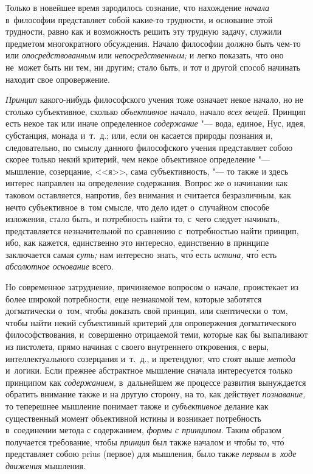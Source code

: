 Только в новейшее время зародилось сознание, что нахождение {\em начала}
в~философии представляет собой какие-то трудности, и основание этой трудности,
равно как и возможность решить эту трудную задачу, служили предметом
многократного обсуждения. Начало философии должно быть чем-то или {\em
опосредствованным} или {\em непосредственным;} и легко показать, что оно
не~может быть ни тем, ни другим; стало быть, и тот и другой способ начинать
находит свое опровержение.

{\em Принцип} какого-нибудь философского учения тоже означает некое начало, но
не столько субъективное, сколько {\em объективное} начало, начало
{\em всех вещей}. Принцип есть некое так или иначе определенное
{\em содержание} "--- вода, единое, Нус, идея, субстанция,
монада и~т.~д.; или, если он касается природы познания и, следовательно, по
смыслу данного философского учения представляет собою скорее только некий
критерий, чем некое объективное определение "--- мышление, созерцание, <<я>>,
сама субъективность, "--- то также и здесь интерес направлен на определение
содержания. Вопрос же о начинании как таковом оставляется, напротив, без
внимания и считается безразличным, как нечто субъективное в~том смысле, что
дело идет о~случайном способе изложения, стало быть, и потребность найти то,
с~чего следует начинать, представляется незначительной по сравнению
с~потребностью найти принцип, ибо, как кажется, единственно это интересно,
единственно в принципе заключается самая {\em суть;} нам интересно знать,
чт\'{о} есть {\em истина,} чт\'{о} есть {\em абсолютное основание} всего.

Но современное затруднение, причиняемое вопросом о~начале, проистекает из более
широкой потребности, еще незнакомой тем, которые заботятся догматически о~том,
чтобы доказать свой принцип, или скептически о~том, чтобы найти некий
субъективный критерий для опровержения догматического философствования,
и~совершенно отрицаемой теми, которые как бы выпаливают из пистолета, прямо
начиная с своего внутреннего откровения, с веры, интеллектуального созерцания
и~т.~д., и претендуют, что стоят выше {\em метода} и~логики. Если прежнее
абстрактное мышление сначала интересуется только принципом как
{\em содержанием,} в~дальнейшем же процессе развития вынуждается обратить
внимание также и на другую сторону, на то, как действует {\em познавание,}
то теперешнее мышление понимает также и {\em субъективное} делание как
существенный момент объективной истины и возникает потребность в~соединении
метода с содержанием, {\em формы с принципом}. Таким образом получается
требование, чтобы {\em принцип} был также началом и чтобы то, чт\'{о}
представляет собою prius (первое) для мышления, было также {\em первым}
в~{\em ходе движения} мышления.

